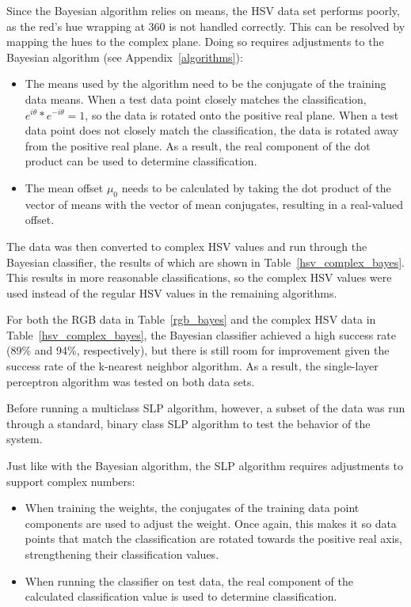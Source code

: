 \documentclass[twoside]{IEEEtran}
\begin{document}
Since the Bayesian algorithm relies on means, the HSV data set performs poorly, as the red's hue
wrapping at 360 is not handled correctly. This can be resolved by mapping the hues to the
complex plane. Doing so requires adjustments to the Bayesian algorithm (see Appendix~\ref{algorithms}):
\begin{itemize}
    \item The means used by the algorithm need to be the conjugate of the training data means.
          When a test data point closely matches the classification, \( e^{i\theta} * e^{-i\theta} = 1 \),
          so the data is rotated onto the positive real plane. When a test data point does not closely
          match the classification, the data is rotated away from the positive real plane. As a result,
          the real component of the dot product can be used to determine classification.

    \item The mean offset \( \mu_0 \) needs to be calculated by taking the dot product of the vector of means
          with the vector of mean conjugates, resulting in a real-valued offset.
\end{itemize}

The data was then converted to complex HSV values and run through the Bayesian classifier, the
results of which are shown in Table~\ref{hsv_complex_bayes}. This results in more reasonable classifications, so the
complex HSV values were used instead of the regular HSV values in the remaining algorithms.

For both the RGB data in Table~\ref{rgb_bayes} and the complex HSV data in Table~\ref{hsv_complex_bayes}, the Bayesian
classifier achieved a high success rate (89\% and 94\%, respectively), but there is still room for
improvement given the success rate of the k-nearest neighbor algorithm. As a result, the single-layer
perceptron algorithm was tested on both data sets.

Before running a multiclass SLP algorithm, however, a subset of the data was run through a standard, binary class SLP algorithm to test the behavior of
the system.

Just like with the Bayesian algorithm, the SLP algorithm requires adjustments to support
complex numbers:

\begin{itemize}
    \item When training the weights, the conjugates of the training data point components are used
          to adjust the weight. Once again, this makes it so data points that match the classification
          are rotated towards the positive real axis, strengthening their classification values.

    \item When running the classifier on test data, the real component of the calculated
          classification value is used to determine classification.
\end{itemize}
\end{document}
